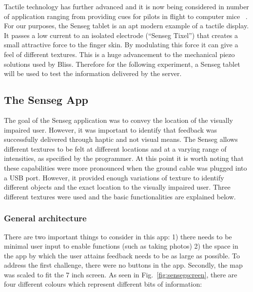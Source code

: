 Tactile technology has further advanced and it is now being considered in number of application ranging from providing cues for pilots in flight \citep{spirkovska2005summary} to computer mice~\citep{akamatsu1996movement} . For our purposes, the Senseg tablet is an apt modern example of a tactile display. It passes a low current to an isolated electrode (``Senseg Tixel'') that creates a small attractive force to the finger skin. By modulating this force it can give a feel of different textures. This is a huge advancement to the mechanical piezo solutions used by Bliss.  Therefore for the following experiment,  a Senseg tablet will be used to test the information delivered by the server.


\subsection{The Senseg App}
The goal of the Senseg application was to convey the location of the visually impaired user. However, it was important to identify that feedback was successfully delivered through haptic and not visual means. The Senseg allows different textures to be felt at different locations and at a varying range of intensities, as specified by the programmer. At this point it is worth noting that these capabilities were more pronounced when the ground cable was plugged into a USB port. However, it provided enough variations of texture to identify different objects and the exact location to the visually impaired user. Three different textures were used and the basic functionalities are explained below.

\subsubsection{General architecture} 
There are two important things to consider in this app: 1) there needs to be minimal user input to enable functions (such as taking photos) 2) the space in the app by which the user attains feedback needs to be as large as possible. To address the first challenge, there were no buttons in the app. Secondly, the map was scaled to fit the 7 inch screen.  As seen in Fig.~\ref{fig:sensegscreen}, there are four different colours which represent different bits of information:


